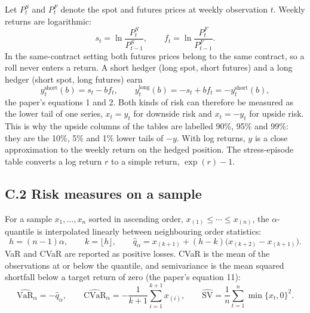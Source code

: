 \documentclass[11pt,letterpaper]{article}
\begin{document}
Let $P^S_t$ and $P^F_t$ denote the spot and futures prices at weekly observation $t$. Weekly returns are logarithmic:
\begin{equation}
s_t = \ln\frac{P^S_t}{P^S_{t-1}}, \qquad f_t = \ln\frac{P^F_t}{P^F_{t-1}} .
\end{equation}
In the same-contract setting both futures prices belong to the same contract, so a roll never enters a return. A short hedger (long spot, short futures) and a long hedger (short spot, long futures) earn
\begin{equation}
y^{\mathrm{short}}_t(b) = s_t - b f_t, \qquad y^{\mathrm{long}}_t(b) = -s_t + b f_t = -y^{\mathrm{short}}_t(b),
\end{equation}
the paper's equations 1 and 2. Both kinds of risk can therefore be measured as the lower tail of one series, $x_t = y_t$ for downside risk and $x_t = -y_t$ for upside risk. This is why the upside columns of the tables are labelled 90\%, 95\% and 99\%: they are the 10\%, 5\% and 1\% lower tails of $-y$. With log returns, $y$ is a close approximation to the weekly return on the hedged position. The stress-episode table converts a log return $r$ to a simple return, $\exp(r) - 1$.

\subsection*{C.2 Risk measures on a sample}

For a sample $x_1,\ldots,x_n$ sorted in ascending order, $x_{(1)} \le \cdots \le x_{(n)}$, the $\alpha$-quantile is interpolated linearly between neighbouring order statistics:
\begin{equation}\label{eq:quantile}
h = (n-1)\alpha, \qquad k = \lfloor h \rfloor, \qquad \hat q_\alpha = x_{(k+1)} + (h-k)\big(x_{(k+2)} - x_{(k+1)}\big).
\end{equation}
VaR and CVaR are reported as positive losses. CVaR is the mean of the observations at or below the quantile, and semivariance is the mean squared shortfall below a target return of zero (the paper's equation 11):
\begin{equation}\label{eq:risk}
\widehat{\mathrm{VaR}}_\alpha = -\hat q_\alpha, \qquad \widehat{\mathrm{CVaR}}_\alpha = -\frac{1}{k+1}\sum_{i=1}^{k+1} x_{(i)}, \qquad \widehat{\mathrm{SV}} = \frac{1}{n}\sum_{t=1}^{n} \min\{x_t, 0\}^2 .
\end{equation}
\par\endgroup
\end{document}
